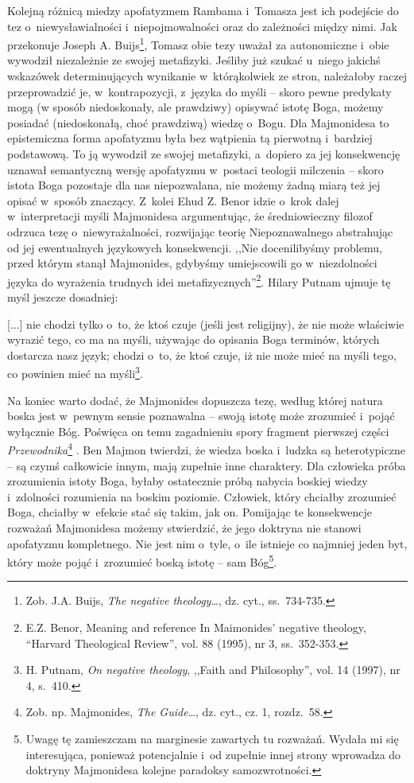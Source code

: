 Kolejną różnicą miedzy apofatyzmem Rambama i~Tomasza jest ich podejście do tez o~niewysławialności i~niepojmowalności oraz do zależności między nimi. Jak przekonuje Joseph A. Buijs\footnote{Zob. J.A. Buijs, \textit{The negative theology}…, dz. cyt., ss.~734-735.}, Tomasz obie tezy uważał za autonomiczne i~obie wywodził niezależnie ze swojej metafizyki. Jeśliby już szukać u~niego jakichś wskazówek determinujących wynikanie w~którąkolwiek ze stron, należałoby raczej przeprowadzić je, w~kontrapozycji, z~języka do myśli -- skoro pewne predykaty mogą (w sposób niedoskonały, ale prawdziwy) opisywać istotę Boga, możemy posiadać (niedoskonałą, choć prawdziwą) wiedzę o~Bogu. Dla Majmonidesa to epistemiczna forma apofatyzmu była bez wątpienia tą pierwotną i~bardziej podstawową. To ją wywodził ze swojej metafizyki, a~dopiero za jej konsekwencję uznawał semantyczną wersję apofatyzmu w~postaci teologii milczenia -- skoro istota Boga pozostaje dla nas niepozwalana, nie możemy żadną miarą też jej opisać w~sposób znaczący. Z~kolei Ehud Z. Benor idzie o~krok dalej w~interpretacji myśli Majmonidesa argumentując, że średniowieczny filozof odrzuca tezę o~niewyrażalności, rozwijając teorię Niepoznawalnego abstrahując od jej ewentualnych językowych konsekwencji. ,,Nie docenilibyśmy problemu, przed którym stanął Majmonides, gdybyśmy umiejscowili go w~niezdolności języka do wyrażenia trudnych idei metafizycznych''\footnote{E.Z. Benor, Meaning and reference In Maimonides' negative theology, ``Harvard Theological Review'', vol. 88 (1995), nr 3, ss.~352-353.}. Hilary Putnam ujmuje tę myśl jeszcze dosadniej:

[...] nie chodzi tylko o~to, że ktoś czuje (jeśli jest religijny), że nie może właściwie wyrazić tego, co ma na myśli, używając do opisania Boga terminów, których dostarcza nasz język; chodzi o~to, że ktoś czuje, iż nie może mieć na myśli tego, co powinien mieć na myśli\footnote{H. Putnam, \textit{On negative theology}, ,,Faith and Philosophy'', vol. 14 (1997), nr 4, s.~410.}.

Na koniec warto dodać, że Majmonides dopuszcza tezę, według której natura boska jest w~pewnym sensie poznawalna -- swoją istotę może zrozumieć i~pojąć wyłącznie Bóg. Poświęca on temu zagadnieniu spory fragment pierwszej części \textit{Przewodnika}\footnote{Zob. np. Majmonides, \textit{The Guide}…, dz. cyt., cz. 1, rozdz.~58.}
. Ben Majmon twierdzi, że wiedza boska i~ludzka są heterotypiczne -- są czymś całkowicie innym, mają zupełnie inne charaktery. Dla człowieka próba zrozumienia istoty Boga, byłaby ostatecznie próbą nabycia boskiej wiedzy i~zdolności rozumienia na boskim poziomie. Człowiek, który chciałby zrozumieć Boga, chciałby w~efekcie stać się takim, jak on. Pomijając te konsekwencje rozważań Majmonidesa możemy stwierdzić, że jego doktryna nie stanowi apofatyzmu kompletnego. Nie jest nim o~tyle, o~ile istnieje co najmniej jeden byt, który może pojąć i~zrozumieć boską istotę -- sam Bóg\footnote{Uwagę tę zamieszczam na marginesie zawartych tu rozważań. Wydała mi się interesująca, ponieważ potencjalnie i~od zupełnie innej strony wprowadza do doktryny Majmonidesa kolejne paradoksy samozwrotności.}.


